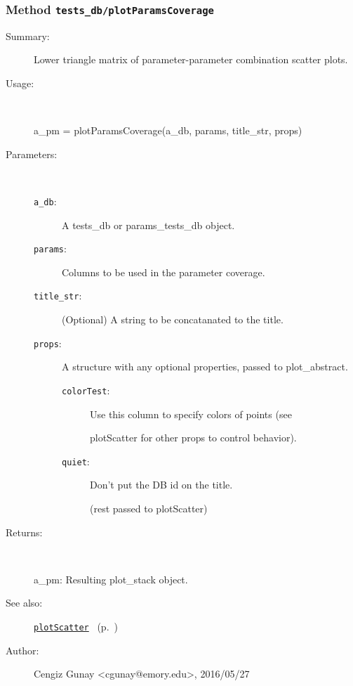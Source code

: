 \subsubsection[Method \texttt{plotParamsCoverage}]{Method \texttt{tests\_db/plotParamsCoverage}}%
%
\label{ref_tests_db__plotParamsCoverage}%
\hypertarget{ref_tests_db__plotParamsCoverage}{}%
\begin{description}
\item[Summary:]Lower triangle matrix of parameter-parameter combination scatter plots.
%
\item[Usage:]~%
\begin{lyxcode}%
a\_pm = plotParamsCoverage(a\_db, params, title\_str, props)
%
\end{lyxcode}%
%
%
\item[Parameters:]~
\begin{description}%
\item[\texttt{a\_db}:]
 A tests\_db or params\_tests\_db object. 
\item[\texttt{params}:]
 Columns to be used in the parameter coverage.
\item[\texttt{title\_str}:]
 (Optional) A string to be concatanated to the title.
\item[\texttt{props}:]
 A structure with any optional properties, passed to plot\_abstract.
\begin{description}%
\item[\texttt{colorTest}:]
 Use this column to specify colors of points (see

plotScatter for other props to control behavior).
\item[\texttt{quiet}:]
 Don't put the DB id on the title.

(rest passed to plotScatter)
\end{description}%
\end{description}%
%
\item[Returns:
]~

   a\_pm: Resulting plot\_stack object.
%
%
\item[See also:]%
\hyperlink{ref_plotScatter}{\texttt{plotScatter}}%
\ (p.~\pageref{ref_plotScatter})%
%
%
\item[Author:]%
Cengiz Gunay <cgunay@emory.edu>, 2016/05/27
%
\end{description}
\methodline%
